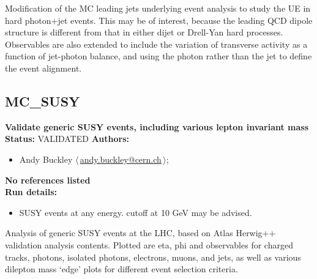 \noindent Modification of the MC leading jets underlying event analysis to study the UE in hard photon+jet events. This may be of interest, because the leading QCD dipole structure is different from that in either dijet or Drell-Yan hard processes. Observables are also extended to include the variation of transverse activity as a function of jet-photon balance, and using the photon rather than the jet to define the event alignment.

\clearpage


\clearpage

\subsection{MC\_SUSY}
\textbf{Validate generic SUSY events, including various lepton invariant mass}\newline
\textbf{Status:} VALIDATED\newline
\textbf{Authors:}
\begin{itemize}
  \item Andy Buckley $\langle\,$\href{mailto:andy.buckley@cern.ch}{andy.buckley@cern.ch}$\,\rangle$;
\end{itemize}
\textbf{No references listed}\\ 
\textbf{Run details:}
\begin{itemize}

  \item SUSY events at any energy. \pT cutoff at 10 GeV may be advised.\end{itemize}

\noindent Analysis of generic SUSY events at the LHC, based on Atlas Herwig++  validation analysis contents. Plotted are eta, phi and \pT observables  for charged tracks, photons, isolated photons, electrons, muons, and jets,  as well as various dilepton mass `edge' plots for different event selection  criteria.

\clearpage


\clearpage

